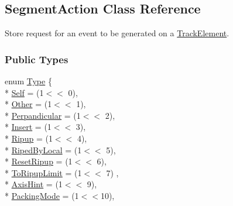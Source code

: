 \hypertarget{classKite_1_1SegmentAction}{\subsection{Segment\-Action Class Reference}
\label{classKite_1_1SegmentAction}
}


Store request for an event to be generated on a \hyperlink{classKite_1_1TrackElement}{Track\-Element}.  


\subsubsection*{Public Types}
\begin{DoxyCompactItemize}
\item 
enum \hyperlink{classKite_1_1SegmentAction_a1d1cfd8ffb84e947f82999c682b666a7}{Type} \{ \\*
\hyperlink{classKite_1_1SegmentAction_a1d1cfd8ffb84e947f82999c682b666a7aacd3ef9d889b306ca7e7bdcd37ba659a}{Self} = (1$<$$<$ 0), 
\\*
\hyperlink{classKite_1_1SegmentAction_a1d1cfd8ffb84e947f82999c682b666a7a75f0c3176be2226dfe8ad164a0a034a2}{Other} = (1$<$$<$ 1), 
\\*
\hyperlink{classKite_1_1SegmentAction_a1d1cfd8ffb84e947f82999c682b666a7a02330ea306385a34162a1e620a1c37df}{Perpandicular} = (1$<$$<$ 2), 
\\*
\hyperlink{classKite_1_1SegmentAction_a1d1cfd8ffb84e947f82999c682b666a7a8c1f14f07c9eedcbbb2cc61988030646}{Insert} = (1$<$$<$ 3), 
\\*
\hyperlink{classKite_1_1SegmentAction_a1d1cfd8ffb84e947f82999c682b666a7a08900dc237aef7e4a7f50d2ba1ffd748}{Ripup} = (1$<$$<$ 4), 
\\*
\hyperlink{classKite_1_1SegmentAction_a1d1cfd8ffb84e947f82999c682b666a7a4fab9c042ba690bdb62d3c34eab8472d}{Riped\-By\-Local} = (1$<$$<$ 5), 
\\*
\hyperlink{classKite_1_1SegmentAction_a1d1cfd8ffb84e947f82999c682b666a7a9e16316a13899c2e02dd49cf2fb6e91f}{Reset\-Ripup} = (1$<$$<$ 6), 
\\*
\hyperlink{classKite_1_1SegmentAction_a1d1cfd8ffb84e947f82999c682b666a7a6c00c46010d69247a3edc18b70d700fa}{To\-Ripup\-Limit} = (1$<$$<$ 7)
, \\*
\hyperlink{classKite_1_1SegmentAction_a1d1cfd8ffb84e947f82999c682b666a7a46c4ca7a69b5eae786be28f75523b78b}{Axis\-Hint} = (1$<$$<$ 9), 
\\*
\hyperlink{classKite_1_1SegmentAction_a1d1cfd8ffb84e947f82999c682b666a7a4fe6b9a3b3816492b9a99ab6689c4b20}{Packing\-Mode} = (1$<$$<$10), 

\end{DoxyCompactItemize}
